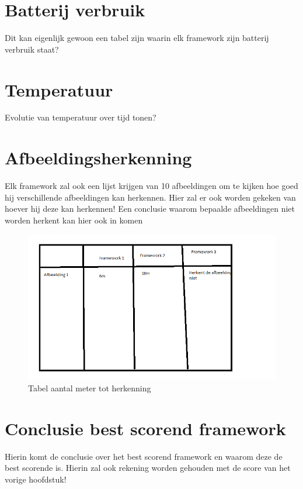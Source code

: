 \section{Batterij verbruik}
Dit kan eigenlijk gewoon een tabel zijn waarin elk framework zijn batterij verbruik staat?
\section{Temperatuur}
Evolutie van temperatuur over tijd tonen?
\section{Afbeeldingsherkenning}
Elk framework zal ook een lijst krijgen van 10 afbeeldingen om te kijken hoe goed hij verschillende afbeeldingen kan herkennen. Hier zal er ook worden gekeken van hoever hij deze kan herkennen!
Een conclusie waarom bepaalde afbeeldingen niet worden herkent kan hier ook in komen
\begin{figure}
    \includegraphics[width=\textwidth]{img/imgrex}\caption{Tabel aantal meter tot herkenning}\label{fig:imgrex}
\end{figure}
\section{Conclusie best scorend framework}
Hierin komt de conclusie over het best scorend framework en waarom deze de best scorende is. Hierin zal ook rekening worden gehouden met de score van het vorige hoofdstuk!